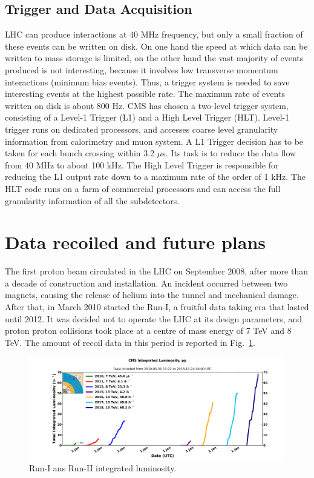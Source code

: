 \subsection*{Trigger and Data Acquisition}
LHC can produce interactions at 40 MHz frequency, but only a small fraction of these
events can be written on disk. On one hand the speed at which data can be written
to mass storage is limited, on the other hand the vast majority of events produced is
not interesting, because it involves low transverse momentum interactions (minimum bias
events). Thus, a trigger system is needed to save interesting events at the highest possible
rate. The maximum rate of events written on disk is about 800 Hz. CMS has chosen a
two-level trigger system, consisting of a Level-1 Trigger (L1)  and a High Level Trigger
(HLT).
Level-1 trigger runs on dedicated processors, and accesses coarse level granularity information 
from calorimetry and muon system. A L1 Trigger decision has to be taken for
each bunch crossing within 3.2 $\mu$s. Its task is to reduce the data flow from 40 MHz to
about 100 kHz. The High Level Trigger is responsible for reducing the L1 output rate down to a maximum
rate of the order of 1 kHz. The HLT code runs on a farm of commercial processors and can access the full granularity information of all the subdetectors.

\section{Data recoiled and future plans}
The first proton beam circulated in the LHC on September 2008, after more than a decade of construction and installation.
An incident occurred between two magnets, causing the release of helium into the tunnel
and mechanical damage. After that, in March  2010 started the Run-I, a fruitful data taking era that lasted until
2012.  It was decided not to operate the LHC at its design parameters, and proton proton collisions
took place at a centre of mass energy of 7 TeV and 8 TeV. The amount of recoil data in this period is reported in Fig.~\ref{int_lumi_cumulative_pp_1}.

\begin{figure}
\centering
\includegraphics[scale= 0.4]{../Cap2/int_lumi_cumulative_pp_1}
\caption{Run-I ans Run-II integrated luminosity.}
\label{int_lumi_cumulative_pp_1}
\end{figure}


